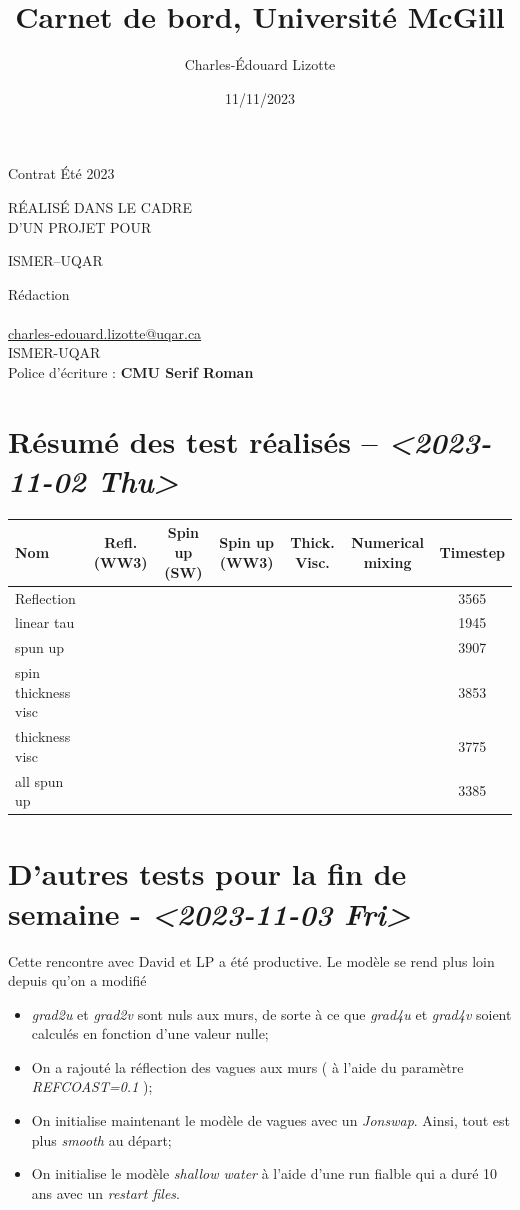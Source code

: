\documentclass[10pt]{article}
\author{Charles-Édouard Lizotte}
\date{11/11/2023}
\title{Carnet de bord, Université McGill}
\makeatletter
\numberwithin{equation}{section}
\newcommand{\cmark}{\ding{52}}
\newcommand{\xmark}{\ding{55}}
\newcommand{\mytitlepage}{
\begin{titlepage}
\begin{center}
{\Huge \thesubtitle \par}
\vspace{2cm}
{\Huge \MakeUppercase{\thetitle} \par}
\vspace{2cm}
RÉALISÉ DANS LE CADRE\\ D'UN PROJET POUR \par
\vspace{2cm}
{\Huge ISMER--UQAR \par}
\vspace{2cm}
{\thedate}
\end{center}
\vfill
Rédaction \\
{\theauthor}\\
\url{charles-edouard.lizotte@uqar.ca}\\
ISMER-UQAR\\
Police d'écriture : \textbf{CMU Serif Roman}
\end{titlepage}
}
\newcommand{\thesubtitle}{Contrat Été 2023}
\makeatother
\begin{document}
\mytitlepage
\tableofcontents\newpage

\section{Résumé des test réalisés -- \textit{<2023-11-02 Thu>}}
\label{sec:org44215e1}
\begin{center}
\begin{tabular}{lcccccc}
Nom & Refl. (WW3) & Spin up (SW) & Spin up (WW3) & Thick. Visc. & Numerical mixing & Timestep\\[0pt]
\hline
\hline
Reflection & \cmark & \xmark & \cmark & \xmark & \cmark & 3565\\[0pt]
linear tau & \xmark & \xmark & \xmark & \xmark & \cmark & 1945\\[0pt]
spun up & \xmark & \cmark & \xmark & \xmark & \cmark & 3907\\[0pt]
spin thickness visc & \xmark & \cmark & \xmark & \cmark & \xmark & 3853\\[0pt]
thickness visc & \xmark & \xmark & \xmark & \cmark & \xmark & 3775\\[0pt]
all spun up & \cmark & \cmark & \cmark & \xmark & \xmark & 3385\\[0pt]
\hline
\end{tabular}
\end{center}



\section{D'autres tests pour la fin de semaine - \textit{<2023-11-03 Fri>}}
\label{sec:orgee0feaa}

Cette rencontre avec David et LP a été productive.
Le modèle se rend plus loin depuis qu'on a modifié
\begin{itemize}
\item \emph{grad2u} et \emph{grad2v} sont nuls aux murs, de sorte à ce que \emph{grad4u} et \emph{grad4v} soient calculés en fonction d'une valeur nulle;
\item On a rajouté la réflection des vagues aux murs ( à l'aide du paramètre \emph{REFCOAST=0.1} );
\item On initialise maintenant le modèle de vagues avec un \emph{Jonswap}.
Ainsi, tout est plus \emph{smooth} au départ;
\item On initialise le modèle \emph{shallow water} à l'aide d'une run fialble qui a duré 10 ans avec un \emph{restart files}.
\end{itemize}
\end{document}
